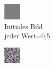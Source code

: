 \begin{figure}[!htb]
\centering
\begin{subfigure}[h]{0.3\textwidth}
  \centering
  \includegraphics[width=\linewidth]{figures/autoencoder_cifar/mi_cifar_start_grey.jpg}
  \caption{Initiales Bild\\jeder Wert=0,5}
\end{subfigure}
\begin{subfigure}[h]{0.3\textwidth}
  \centering
  \includegraphics[width=\linewidth]{figures/autoencoder_cifar/mi_cifar_mid_grey.jpg}

\end{subfigure}
\end{figure}
